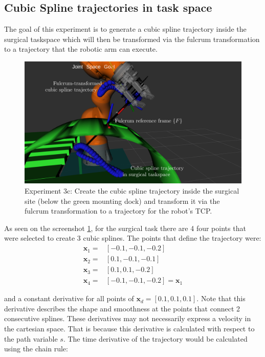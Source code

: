 \subsection{Cubic Spline trajectories in task space}

The goal of this experiment is to generate a cubic spline trajectory inside the surgical
taskspace which will then be transformed via the fulcrum transformation to a trajectory that the robotic arm can execute.

\begin{center}
\begin{figure}[!htb]
\centering
\includegraphics[width=\textwidth]{images/robot_planner3/3c_cubic_spline.png}
\caption{Experiment 3c: Create the cubic spline trajectory inside the surgical site (below the green mounting dock) and transform it via the fulcrum transformation to a trajectory for the robot's TCP.}
\label{robot-planner3c-cubic-spline}
\end{figure}
\end{center}

As seen on the screenshot \ref{robot-planner3c-cubic-spline}, for the surgical task there are 4 four points that were selected to create 3 cubic splines. The points that define the trajectory were:
\[
\begin{aligned}
\mathbf{x}_1 ={}& [-0.1, -0.1, -0.2] \\
\mathbf{x}_2 ={}& [0.1, -0.1, -0.1] \\
\mathbf{x}_3 ={}& [0.1, 0.1, -0.2] \\
\mathbf{x}_4 ={}& [-0.1, -0.1, -0.2] = \mathbf{x}_1
\end{aligned}
\]

and a constant derivative for all points of $\mathbf{x}_d = [0.1, 0.1, 0.1]$. Note that this derivative describes the shape and smoothness at the points that connect 
2 consecutive splines. These derivatives may not necessarily express a velocity in the cartesian space. That is because this derivative is calculated with respect 
to the path variable $s$. The time derivative of the trajectory would be calculated using the chain rule:

